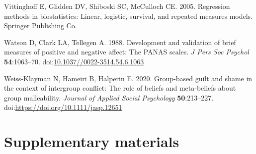 \documentclass[
]{article}
\newlength{\cslhangindent}
\newenvironment{CSLReferences}[2] %
 {\begin{list}{}{%
  \setlength{\itemindent}{0pt}
  \setlength{\leftmargin}{0pt}
  \setlength{\parsep}{0pt}
  \ifodd #1
   \setlength{\leftmargin}{\cslhangindent}
   \setlength{\itemindent}{-1\cslhangindent}
  \fi
  \setlength{\itemsep}{#2\baselineskip}}}
 {\end{list}}
\newcommand{\beginsupplement}{\setcounter{table}{0}
\renewcommand{\thetable}{S\arabic{table}}
\setcounter{figure}{0}
\renewcommand{\thefigure}{S\arabic{figure}}}
\begin{document}
\begin{CSLReferences}{1}{0}
Vittinghoff E, Glidden DV, Shiboski SC, McCulloch CE. 2005. Regression methods in biostatistics: Linear, logistic, survival, and repeated measures models. Springer Publishing Co.

Watson D, Clark LA, Tellegen A. 1988. Development and validation of brief measures of positive and negative affect: The PANAS scales. \emph{J Pers Soc Psychol} \textbf{54}:1063--70. doi:\href{https://doi.org/10.1037//0022-3514.54.6.1063}{10.1037//0022-3514.54.6.1063}

Weiss-Klayman N, Hameiri B, Halperin E. 2020. Group-based guilt and shame in the context of intergroup conflict: The role of beliefs and meta-beliefs about group malleability. \emph{Journal of Applied Social Psychology} \textbf{50}:213--227. doi:\url{https://doi.org/10.1111/jasp.12651}

\end{CSLReferences}

\section*{Supplementary materials}\label{supplementary-materials}

\beginsupplement
\end{document}
